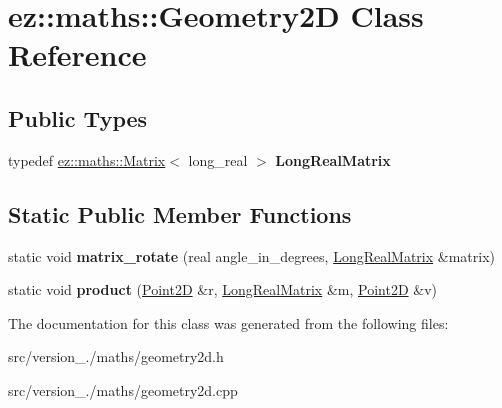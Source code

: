 \hypertarget{classez_1_1maths_1_1Geometry2D}{}\section{ez\+:\+:maths\+:\+:Geometry2D Class Reference}
\label{classez_1_1maths_1_1Geometry2D}
\subsection*{Public Types}
\begin{DoxyCompactItemize}
\item 
\mbox{\label{classez_1_1maths_1_1Geometry2D_a686fb50d9c63b622916b7f3faab0c620}} 
typedef \hyperlink{classez_1_1maths_1_1Matrix}{ez\+::maths\+::\+Matrix}$<$ long\+\_\+real $>$ {\bfseries Long\+Real\+Matrix}
\end{DoxyCompactItemize}
\subsection*{Static Public Member Functions}
\begin{DoxyCompactItemize}
\item 
\mbox{\label{classez_1_1maths_1_1Geometry2D_a495e445c642152ab2ad4d8a6aaec3f09}} 
static void {\bfseries matrix\+\_\+rotate} (real angle\+\_\+in\+\_\+degrees, \hyperlink{classez_1_1maths_1_1Matrix}{Long\+Real\+Matrix} \&matrix)
\item 
\mbox{\label{classez_1_1maths_1_1Geometry2D_a23fcbdff26104254e2085788950c87b8}} 
static void {\bfseries product} (\hyperlink{classez_1_1maths_1_1Point2D}{Point2D} \&r, \hyperlink{classez_1_1maths_1_1Matrix}{Long\+Real\+Matrix} \&m, \hyperlink{classez_1_1maths_1_1Point2D}{Point2D} \&v)
\end{DoxyCompactItemize}


The documentation for this class was generated from the following files\+:\begin{DoxyCompactItemize}
\item 
src/version\+\_./maths/geometry2d.\+h\item 
src/version\+\_./maths/geometry2d.\+cpp\end{DoxyCompactItemize}
